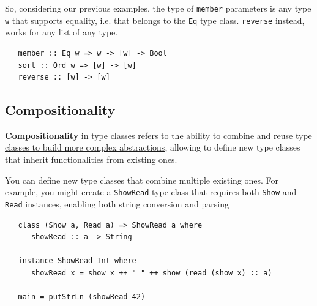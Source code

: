 So, considering our previous examples, the type of \lstinline|member| parameters is any type \lstinline|w| that supports equality, i.e. that belongs to the \lstinline|Eq| type class.
\lstinline|reverse| instead, works for any list of any type.
\begin{lstlisting}
   member :: Eq w => w -> [w] -> Bool
   sort :: Ord w => [w] -> [w]
   reverse :: [w] -> [w]
\end{lstlisting}


\subsection{Compositionality}
\textbf{Compositionality} in type classes refers to the ability to \ul{combine and reuse type classes to build more complex abstractions}, allowing to define new type classes that inherit functionalities from existing ones.

You can define new type classes that combine multiple existing ones. For example, you might create a \lstinline|ShowRead| type class that requires both \lstinline|Show| and \lstinline|Read| instances, enabling both string conversion and parsing
\begin{lstlisting}
   class (Show a, Read a) => ShowRead a where
      showRead :: a -> String
   
   instance ShowRead Int where
      showRead x = show x ++ " " ++ show (read (show x) :: a)

   main = putStrLn (showRead 42)
\end{lstlisting}


